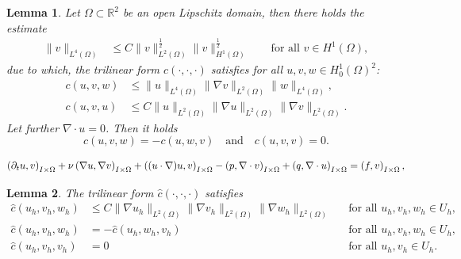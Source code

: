 \documentclass[10pt,a4paper]{amsart}
\newtheorem{lemma}{Lemma}
\newcommand{\IOprod}[1]{\left( #1 \right)_{I\times\Omega}}
\newcommand{\R}{\mathbb{R}}
\newcommand\blue[1]{\textcolor{black}{#1}}
\newcommand{\cO}[1]{c\left( #1 \right)}
\newcommand{\chatO}[1]{\hat c\left( #1 \right)}
\begin{document}
\begin{lemma}\label{lemm:c_swap}
  Let $\Omega \subset \R^2$ be an open Lipschitz domain, then there holds the estimate
  \begin{align}
    \|v\|_{L^4(\Omega)} &\le C\|v\|_{L^2(\Omega)}^{\frac{1}{2}}\|v\|_{H^1(\Omega)}^{\frac{1}{2}}
    \qquad \text{for all } v \in H^1(\Omega),
    \label{eq:l4_interpol_general}
  \end{align}
  due to which, the trilinear form $\cO{\cdot,\cdot,\cdot}$ satisfies for all $u,v,w \in H^1_0(\Omega)^2$:
  \begin{align*}
    \cO{u,v,w} & \le \|u\|_{L^4(\Omega)} \|\nabla v\|_{L^2(\Omega)} \|w\|_{L^4(\Omega)},\\
    \cO{u,v,u} & \le C\|u\|_{L^2(\Omega)} \|\nabla u\|_{L^2(\Omega)}\|\nabla v\|_{L^2(\Omega)}.
  \end{align*}
  Let further $\nabla \cdot u = 0$. Then it holds
  \begin{equation*}
    \cO{u,v,w} = - \cO{u,w,v} \quad \text{and} \quad 
    \cO{u,v,v} = 0.
  \end{equation*}
\end{lemma}

  \begin{equation}\label{eq:nav_stokes_weak_with_pressure}
    \blue{\IOprod{\partial_t u,v} }
    + \nu \IOprod{\nabla u, \nabla v} 
    + \IOprod{(u\cdot \nabla)u,v}
    - \IOprod{p,\nabla \cdot v} + \IOprod{q, \nabla \cdot u} 
    = \IOprod{f,v},
  \end{equation}

\begin{lemma}\label{lemm:chat}
  The trilinear form $\chatO{\cdot,\cdot,\cdot}$ satisfies
  \begin{align*}
    \chatO{u_h,v_h,w_h} & \le C\|\nabla u_h\|_{L^2(\Omega)} \|\nabla v_h\|_{L^2(\Omega)} 
    \|\nabla w_h\|_{L^2(\Omega)} && \text{for all } u_h, v_h, w_h \in U_h,\\
    \chatO{u_h, v_h, w_h} &= - \chatO{u_h,w_h,v_h} && \text{for all } u_h, v_h, w_h \in U_h,\\
    \chatO{u_h, v_h, v_h} &= 0 && \text{for all } u_h, v_h \in U_h.
  \end{align*}
\end{lemma}
\end{document}
